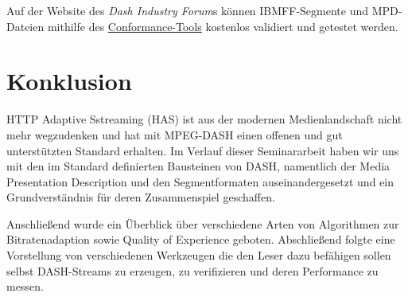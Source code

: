 \documentclass[paper = a4, fontsize = 12pt, parskip = half]{scrartcl} %
\begin{document}
Auf der Website des \textit{Dash Industry Forum}s können IBMFF-Segmente und MPD-Dateien mithilfe des \hyperref{https://conformance.dashif.org/}{}{}{Conformance-Tools} kostenlos validiert und getestet werden.

\section{Konklusion}
HTTP Adaptive Sstreaming (HAS) ist aus der modernen Medienlandschaft nicht mehr wegzudenken und hat mit MPEG-DASH einen offenen und gut unterstützten Standard erhalten. Im Verlauf dieser Seminararbeit haben wir uns mit den im Standard definierten Bausteinen von DASH, namentlich der Media Presentation Description und den Segmentformaten auseinandergesetzt und ein Grundverständnis für deren Zusammenspiel geschaffen.

Anschließend wurde ein Überblick über verschiedene Arten von Algorithmen zur Bitratenadaption sowie Quality of Experience geboten. Abschließend folgte eine Vorstellung von verschiedenen Werkzeugen die den Leser dazu befähigen sollen selbst DASH-Streams zu erzeugen, zu verifizieren und deren Performance zu messen.


\newpage
\printbibliography
\end{document}
